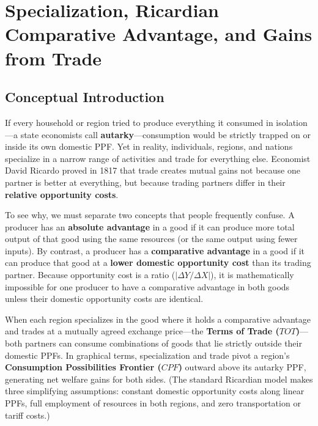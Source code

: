 \documentclass[11pt,letterpaper]{article}
\begin{document}
\section{Specialization, Ricardian Comparative Advantage, and Gains from Trade}

\subsection*{Conceptual Introduction}
If every household or region tried to produce everything it consumed in isolation—a state economists call \textbf{autarky}—consumption would be strictly trapped on or inside its own domestic PPF. Yet in reality, individuals, regions, and nations specialize in a narrow range of activities and trade for everything else. Economist David Ricardo proved in 1817 that trade creates mutual gains not because one partner is better at everything, but because trading partners differ in their \textbf{relative opportunity costs}.

To see why, we must separate two concepts that people frequently confuse. A producer has an \textbf{absolute advantage} in a good if it can produce more total output of that good using the same resources (or the same output using fewer inputs). By contrast, a producer has a \textbf{comparative advantage} in a good if it can produce that good at a \textbf{lower domestic opportunity cost} than its trading partner. Because opportunity cost is a ratio ($\left|\Delta Y / \Delta X\right|$), it is mathematically impossible for one producer to have a comparative advantage in both goods unless their domestic opportunity costs are identical.

When each region specializes in the good where it holds a comparative advantage and trades at a mutually agreed exchange price—the \textbf{Terms of Trade ($TOT$)}—both partners can consume combinations of goods that lie strictly outside their domestic PPFs. In graphical terms, specialization and trade pivot a region's \textbf{Consumption Possibilities Frontier ($CPF$)} outward above its autarky PPF, generating net welfare gains for both sides. (The standard Ricardian model makes three simplifying assumptions: constant domestic opportunity costs along linear PPFs, full employment of resources in both regions, and zero transportation or tariff costs.)
\end{document}
